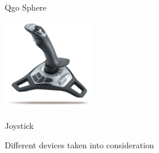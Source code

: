 \begin{figure}[h]
{\begin{center}
{			\begin{center}Qgo Sphere \end{center}}
			\hspace{0.05\textwidth}
			\parbox[b]{0.35\textwidth}{\includegraphics[width=0.35\textwidth]{Logitech-Freedom-Cordless-Joystick}
			\begin{center}Joystick \end{center}}
			\caption[Different devices taken into consideration]{Different devices taken into consideration}
			\label{figure:devices taken into consideration}	
		\end{center}
	}			
	\vspace{4.5mm}
\end{figure}

